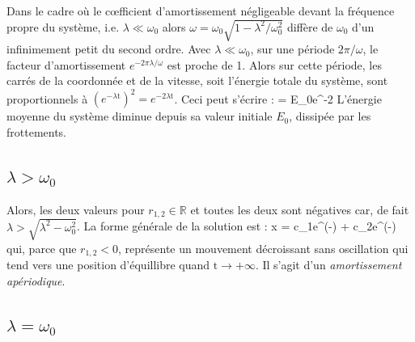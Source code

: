 Dans le cadre o\`{u} le c{\oe}fficient d'amortissement n\'{e}gligeable devant la fr\'{e}quence propre du syst\`{e}me, i.e. $\lambda \ll \omega_{0}$ alors $\omega = \omega_{0}\sqrt{1 - \lambda^{2}/\omega_{0}^{2}}$ diff\`{e}re de $\omega_{0}$ d'un infinimement petit du second ordre. Avec $\lambda \ll \omega_{0}$, sur une p\'{e}riode $2\pi/\omega$, le facteur d'amortissement $e^{-2\pi\lambda/\omega}$ est proche de 1. Alors sur cette p\'{e}riode, les carr\'{e}s de la coordonn\'{e}e et de la vitesse, soit l'\'{e}nergie totale du syst\`{e}me, sont proportionnels \`{a} $(e^{-\lambda\mathrm{t}})^{2} = e^{-2\lambda\mathrm{t}}$. Ceci peut s'\'{e}crire :
\be
	 = E_{0}e^{-2\lambda{}} \label{EQ:25_5}
\ee
L'\'{e}nergie moyenne du syst\`{e}me diminue depuis sa valeur initiale $E_{0}$, dissip\'{e}e par les frottements.

\subsection{$\lambda > \omega_{0}$}

Alors, les deux valeurs pour $r_{1,2} \in \mathbb{R}$ et toutes les deux sont n\'{e}gatives car, de fait $\lambda > \sqrt{\lambda^{2} - \omega_{0}^{2}}$. La forme g\'{e}n\'{e}rale de la solution est :
\be
	x = c_{1}e^{\left(-\lambda \pm {}\right)} + c_{2}e^{\left(-\lambda \pm {}\right)} \label{EQ:25_6}
\ee
qui, parce que $r_{1,2} < 0$, repr\'{e}sente un mouvement d\'{e}croissant sans oscillation qui tend vers une position d'\'{e}quillibre quand $\mathrm{t} \rightarrow +\infty$. Il s'agit d'un \emph{amortissement ap\'{e}riodique}.

\subsection{$\lambda = \omega_{0}$}

